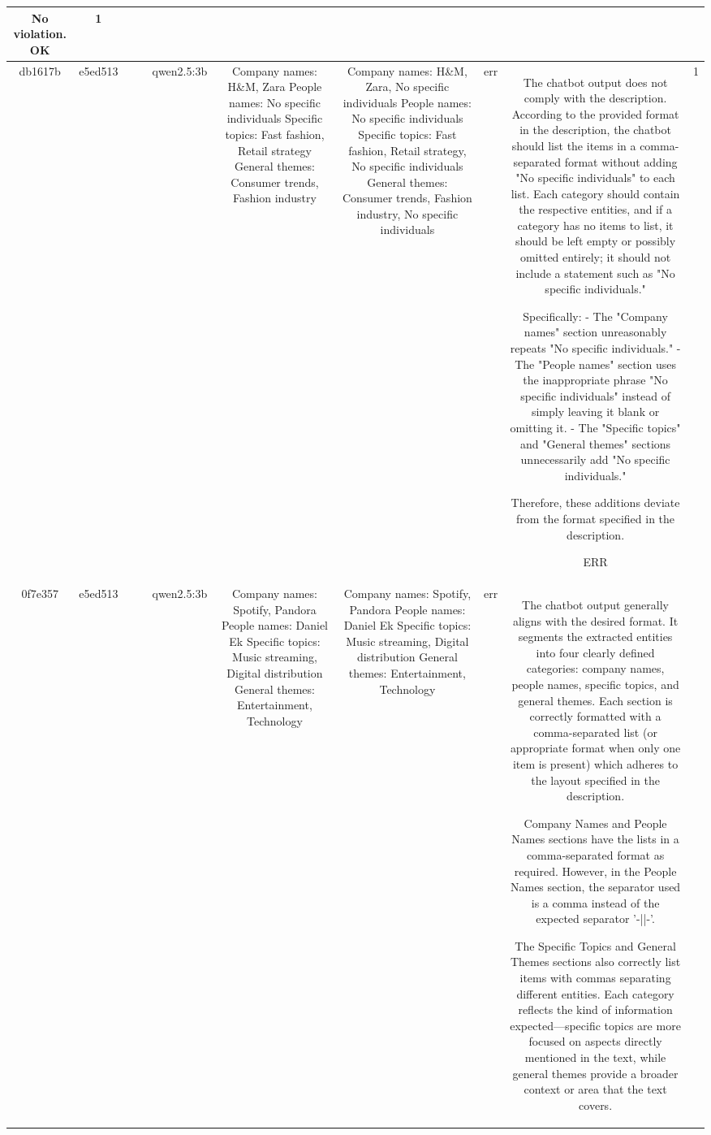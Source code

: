 \begin{table}[h!]
\begin{tabular}{|c|c|c|c|c|c|c|c|c|c|}
No violation.
OK & 1\\
\hline
db1617b & e5ed513 &  &  & qwen2.5:3b & Company names: H\&M, Zara
People names: No specific individuals
Specific topics: Fast fashion, Retail strategy
General themes: Consumer trends, Fashion industry & Company names: H\&M, Zara, No specific individuals
People names: No specific individuals
Specific topics: Fast fashion, Retail strategy, No specific individuals
General themes: Consumer trends, Fashion industry, No specific individuals & err & The chatbot output does not comply with the description. According to the provided format in the description, the chatbot should list the items in a comma-separated format without adding "No specific individuals" to each list. Each category should contain the respective entities, and if a category has no items to list, it should be left empty or possibly omitted entirely; it should not include a statement such as "No specific individuals." 

Specifically:
- The "Company names" section unreasonably repeats "No specific individuals."
- The "People names" section uses the inappropriate phrase "No specific individuals" instead of simply leaving it blank or omitting it.
- The "Specific topics" and "General themes" sections unnecessarily add "No specific individuals." 

Therefore, these additions deviate from the format specified in the description.

ERR & 1\\
\hline
0f7e357 & e5ed513 &  &  & qwen2.5:3b & Company names: Spotify, Pandora
People names: Daniel Ek
Specific topics: Music streaming, Digital distribution
General themes: Entertainment, Technology & Company names: Spotify, Pandora
People names: Daniel Ek
Specific topics: Music streaming, Digital distribution
General themes: Entertainment, Technology & err & The chatbot output generally aligns with the desired format. It segments the extracted entities into four clearly defined categories: company names, people names, specific topics, and general themes. Each section is correctly formatted with a comma-separated list (or appropriate format when only one item is present) which adheres to the layout specified in the description.

Company Names and People Names sections have the lists in a comma-separated format as required. However, in the People Names section, the separator used is a comma instead of the expected separator '-||-'. 

The Specific Topics and General Themes sections also correctly list items with commas separating different entities. Each category reflects the kind of information expected—specific topics are more focused on aspects directly mentioned in the text, while general themes provide a broader context or area that the text covers.


\end{tabular}
\end{table}
